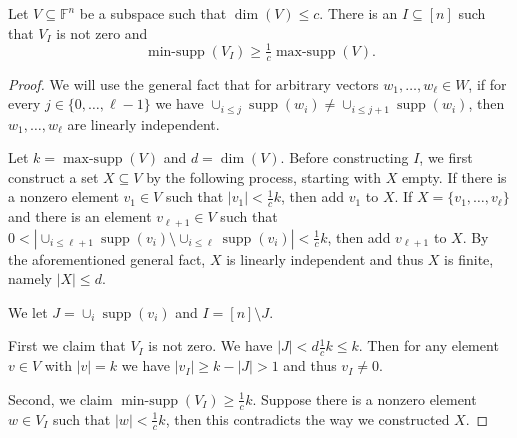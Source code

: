 \documentclass{daj}
\DeclareMathOperator{\supp}{supp}
\newcommand{\FF}{\mathbb{F}}
\DeclareMathOperator{\minsupp}{min-supp}
\DeclareMathOperator{\maxsupp}{max-supp}
\begin{document}
\begin{lemma}\label{lem:minsupp}
Let $V \subseteq \FF^n$ be a subspace such that $\dim(V) \leq c$.  
There is an $I \subseteq [n]$ such that $V_I$ is not zero and
\[
\minsupp(V_I) \geq \tfrac1c \maxsupp(V).
\]
\end{lemma}
\begin{proof}
    We will use the general fact that for arbitrary vectors $w_1, \ldots, w_\ell \in W$, if for every $j\in \{0, \ldots, \ell-1\}$ we have $\cup_{i \leq j} \supp(w_i) \neq \cup_{i \leq j + 1} \supp(w_i)$, then $w_1, \ldots, w_\ell$ are linearly independent.

    Let $k = \maxsupp(V)$ and $d = \dim(V)$.
    Before constructing $I$, we first construct a set $X \subseteq V$ by the following process, starting with $X$ empty.
    If there is a nonzero element $v_1 \in V$ such that $|v_1| < \tfrac1c k$, then add $v_1$ to $X$.
    If $X = \{v_1, \ldots, v_\ell\}$ and there is an element $v_{\ell + 1} \in V$ such that 
    $0 < |\cup_{i \leq \ell+1} \supp(v_i) \setminus \cup_{i \leq \ell} \supp(v_i)| < \tfrac1c k$, then add $v_{\ell+1}$ to $X$.
    By the aforementioned general fact, $X$ is linearly independent and thus $X$ is finite, namely $|X| \leq d$.

    
    We let $J = \cup_i \supp(v_i)$ and $I = [n] \setminus J$.
    
    First we claim that $V_I$ is not zero. We have $|J| < d\tfrac1c k \leq k$.
    Then for any element $v \in V$ with $|v| = k$ we have $|v_I| \geq k - |J| > 1$ and thus $v_I \neq 0$.
    
    Second, we claim $\minsupp(V_I) \geq \tfrac1c k$.  Suppose there is a nonzero element $w \in V_I$ such that $|w| < \tfrac1c k$, then this contradicts the way we constructed $X$.
\end{proof}
\end{document}
